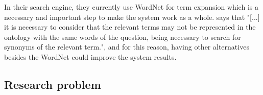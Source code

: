 In their search engine, they currently use WordNet for term expansion which is a necessary and important step to make the system work as a whole.  says that 
"[...] it is necessary to consider that the relevant terms may not be represented in the ontology with the same words of the question, being necessary to search for synonyms of the relevant term.",
and for this reason, having other alternatives besides the WordNet could improve the system results.

\subsection{Research problem} 





